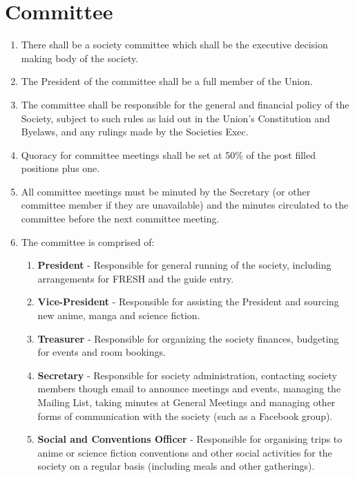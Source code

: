 \documentclass[a4paper,10pt]{article}
\begin{document}
\section{Committee}
\begin{enumerate}
  \item There shall be a society committee which shall be the executive decision making body of the society.
  \item The President of the committee shall be a full member of the Union.
  \item The committee shall be responsible for the general and financial policy of the Society, subject to such rules as laid out in the Union's Constitution and Byelaws, and any rulings made by the Societies Exec.
  \item Quoracy for committee meetings shall be set at 50\% of the post filled positions plus one.
  \item All committee meetings must be minuted by the Secretary (or other committee member if they are unavailable) and the minutes circulated to the committee before the next committee meeting.
  \item The committee is comprised of:
  \begin{enumerate}
    \item \textbf{President} - Responsible for general running of the society, including arrangements for FRESH and the guide entry.
    \item \textbf{Vice-President} - Responsible for assisting the President and sourcing new anime, manga and science fiction.
    \item \textbf{Treasurer} - Responsible for organizing the society finances, budgeting for events and room bookings.
    \item \textbf{Secretary} - Responsible for society administration, contacting society members though email to announce meetings and events, managing the Mailing List, taking minutes at General Meetings and managing other forms of communication with the society (such as a Facebook group).
    \item \textbf{Social and Conventions Officer} - Responsible for organising trips to anime or science fiction conventions and other social activities for the society on a regular basis (including meals and other gatherings).
  \end{enumerate}
\end{enumerate}
\end{document}
